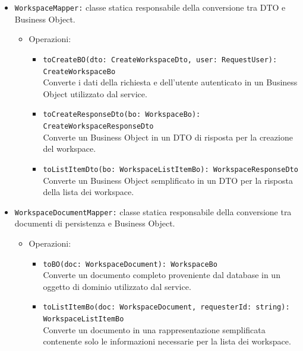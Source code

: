 \documentclass[a4paper, 11pt]{article}
\begin{document}
\begin{itemize}
\begin{itemize}
        
        \item \texttt{WorkspaceMapper:} classe statica responsabile della conversione tra DTO e Business Object.
        \begin{itemize}
          \item Operazioni:
        \begin{itemize}
            \item \texttt{toCreateBO(dto: CreateWorkspaceDto, user: RequestUser): CreateWorkspaceBo} \\
            Converte i dati della richiesta e dell'utente autenticato in un Business Object utilizzato dal service.
            
            \item \texttt{toCreateResponseDto(bo: WorkspaceBo): CreateWorkspaceResponseDto} \\
            Converte un Business Object in un DTO di risposta per la creazione del workspace.
            
            \item \texttt{toListItemDto(bo: WorkspaceListItemBo): WorkspaceResponseDto} \\
            Converte un Business Object semplificato in un DTO per la risposta della lista dei workspace.
        \end{itemize}
        \end{itemize}
        
        
        \item \texttt{WorkspaceDocumentMapper:} classe statica responsabile della conversione tra documenti di persistenza e Business Object.
        \begin{itemize}
          \item Operazioni:
       
        \begin{itemize}
            \item \texttt{toBO(doc: WorkspaceDocument): WorkspaceBo} \\
            Converte un documento completo proveniente dal database in un oggetto di dominio utilizzato dal service.
            
            \item \texttt{toListItemBo(doc: WorkspaceDocument, requesterId: string): WorkspaceListItemBo} \\
            Converte un documento in una rappresentazione semplificata contenente solo le informazioni necessarie per la lista dei workspace.
        \end{itemize}
        \end{itemize}
    \end{itemize}
\end{itemize}
\end{document}

